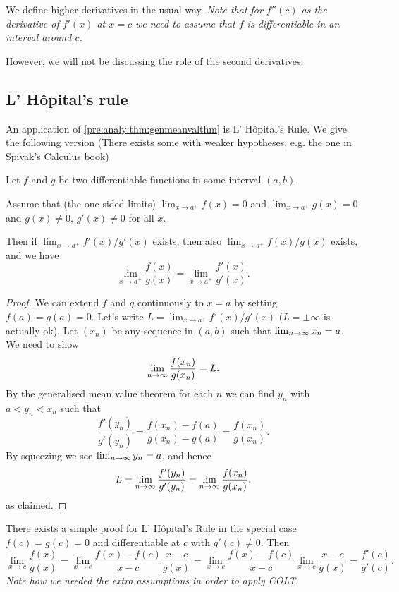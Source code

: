 \documentclass[10pt, a4paper]{article}
\begin{document}
We define higher derivatives in the usual way.
\textit{Note that for $f''(c)$ as the derivative of $f'(x)$ at $x = c$ we need to assume that $f$ is differentiable in an interval around $c$.}

However,
we will not be discussing the role of the second derivatives.

\subsection{L' H\^opital's rule}

An application of \autoref{pre:analy:thm:genmeanvalthm} is L' H\^opital's Rule.
We give the following version
(There exists some with weaker hypotheses,
e.g. the one in Spivak's Calculus book)

\begin{theorem}\label{pre:analy:thm:lhopitalsrule}
    Let $f$ and $g$ be two differentiable functions in some interval $(a, b)$.

    Assume that
    (the one-sided limits)
    $\lim_{x \rightarrow a ^ {+}}f(x) = 0$ and $\lim_{x \rightarrow a ^ {+}}g(x) = 0$ and $g(x) \neq 0$,
    $g'(x) \neq 0$ for all $x$.

    Then if $\lim_{x \rightarrow a ^ {+}}f'(x) / g'(x)$ exists,
    then also $\lim_{x \rightarrow a ^ {+}}f(x) / g(x)$ exists,
    and we have
    \[
    \lim_{x \rightarrow a ^ {+}}\frac{f(x)}{g(x)} = \lim_{x \rightarrow a ^ {+}}\frac{f'(x)}{g'(x)}.
    \]
    \begin{proof}
        We can extend $f$ and $g$ continuously to $x = a$ by setting $f(a) = g(a) = 0$.
        Let's write $L = \lim_{x \rightarrow a ^ {+}}f'(x) / g'(x)$
        ($L = \pm\infty$ is actually ok).
        Let $(x_n)$ be any sequence in $(a, b)$ such that $\lim_{n \rightarrow \infty} x_n = a$.
        We need to show
        \[
        \lim_{n \rightarrow \infty}\frac{f(x_n)}{g(x_n)} = L.
        \]
        By the generalised mean value theorem for each $n$ we can find $y_n$ with $a < y_n < x_n$ such that
        \[
        \frac{f'(y_n)}{g'(y_n)} = \frac{f(x_n) - f(a)}{g(x_n) - g(a)} = \frac{f(x_n)}{g(x_n)}.
        \]
        By squeezing we see $\lim_{n \rightarrow \infty} y_n = a$,
        and hence
        \[
        L = \lim_{n \rightarrow \infty}\frac{f'(y_n)}{g'(y_n)} = \lim_{n \rightarrow \infty}\frac{f(x_n)}{g(x_n)},
        \]
        as claimed.
    \end{proof}
\end{theorem}

\begin{remark}
    There exists a simple proof for L' H\^opital's Rule in the special case $f(c) = g(c) = 0$ and differentiable at $c$ with $g'(c) \neq 0$.
    Then
    \[
    \lim_{x \rightarrow c}\frac{f(x)}{g(x)} = \lim_{x \rightarrow c}\frac{f(x) - f(c)}{x - c}\frac{x - c}{g(x)} = \lim_{x \rightarrow c}\frac{f(x) - f(c)}{x - c}\lim_{x \rightarrow c}\frac{x - c}{g(x)} = \frac{f'(c)}{g'(c)}.
    \]
    \textit{Note how we needed the extra assumptions in order to apply COLT}.
\end{remark}
\end{document}
